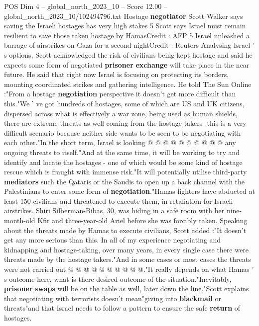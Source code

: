 \begin{textsample}{POS Dim 4 – global\_north\_2023\_10 – Score 12.00 – global\_north\_2023\_10/102494796.txt}  \label{ex:f4_pos_447}
Hostage \textbf{negotiator} Scott Walker says saving the Israeli hostages has very high stakes 5 Scott says Israel must remain resilient to save those taken hostage by HamasCredit : AFP 5 Israel unleashed a barrage of airstrikes on Gaza for a second nightCredit : Reuters Analysing Israel ' s options, Scott acknowledged the risk of civilians being kept hostage and said he expects some form of negotiated \textbf{prisoner} \textbf{exchange} will take place in the near future.
He said that right now Israel is focusing on protecting its borders, mounting coordinated strikes and gathering intelligence.
He told The Sun Online :"From a hostage \textbf{negotiation} perspective it doesn't get more difficult than this."We ' ve got hundreds of hostages, some of which are US and UK citizens, dispersed across what is effectively a war zone, being used as human shields, there are extreme threats as well coming from the hostage takers- this is a very difficult scenario because neither side wants to be seen to be negotiating with each other."In the short term, Israel is looking @ @ @ @ @ @ @ @ @ @ any ongoing threats to itself."And at the same time, it will be working to try and identify and locate the hostages - one of which would be some kind of hostage rescue which is fraught with immense risk."It will potentially utilise third-party \textbf{mediators} such the Qataris or the Saudis to open up a back channel with the Palestinians to enter some form of \textbf{negotiation}."Hamas fighters have abducted at least 150 civilians and threatened to execute them, in retaliation for Israeli airstrikes.
Shiri Silberman-Bibas, 30, was hiding in a safe room with her nine-month-old Kfir and three-year-old Ariel before she was forcibly taken.
Speaking about the threats made by Hamas to execute civilians, Scott added :"It doesn't get any more serious than this.
In all of my experience negotiating and kidnapping and hostage-taking, over many years, in every single case there were threats made by the hostage takers."And in some cases or most cases the threats were not carried out @ @ @ @ @ @ @ @ @ @."It really depends on what Hamas ' s outcome here, what is there desired outcome of the situation."Inevitably, \textbf{prisoner} \textbf{swaps} will be on the table as well, later down the line."Scott explains that negotiating with terrorists doesn't mean"giving into \textbf{blackmail} or threats"and that Israel needs to follow a pattern to ensure the safe \textbf{return} of hostages.

\end{textsample}
